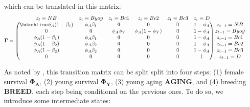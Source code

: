 \documentclass[
  12pt,
]{krantz}
\begin{document}
which can be translated in this matrix:
\[
\begin{matrix}
& \\
\mathbf{\Gamma} =
\left ( \vphantom{ \begin{matrix} 12 \\ 12 \\ 12 \\ 12 \\ 12 \\ 12 \end{matrix} } \right .
\end{matrix}
\hspace{-1.2em}
\begin{matrix}
z_t=NB & z_t = Byoy & z_t = Bc1 & z_t = Bc2 & z_t = Bc3 & z_t = D \\ \hdashline
\phi_A (1 - \beta_1) & \phi_A \beta_1 & 0 & 0 & 0 & 1 - \phi_A \\
0 & 0 & \phi_A \phi_Y & \phi_A (1-\phi_Y) & 0 & 1-\phi_A \\
\phi_A (1 - \beta_1) & \phi_A \beta_1 & 0 & 0 & 0 & 1-\phi_A \\
\phi_A (1 - \beta_2) & \phi_A \beta_2 & 0 & 0 & 0 & 1-\phi_A \\
\phi_A (1 - \beta_2) & \phi_A \beta_2 & 0 & 0 & 0 & 1-\phi_A \\
0 & 0 & 0 & 0 & 0 & 1
\end{matrix}
\hspace{-0.2em}
\begin{matrix}
& \\
\left . \vphantom{ \begin{matrix} 12 \\ 12 \\ 12 \\ 12 \\ 12 \\ 12 \end{matrix} } \right )
\begin{matrix}
z_{t-1} = NB \\
z_{t-1} = Byoy \\
z_{t-1} = Bc1 \\
z_{t-1} = Bc2 \\
z_{t-1} = Bc3 \\
z_{t-1} = D
\end{matrix}
\end{matrix}
\]

As noted by \citet{couet2019}, this transition matrix can be split split into four steps: (1) female survival \(\mathbf{\Phi_A}\), (2) young survival \(\mathbf{\Phi_Y}\), (3) young aging \(\mathbf{AGING}\), and (4) breeding \(\mathbf{BREED}\), each step being conditional on the previous ones. To do so, we introduce some intermediate states:
\end{document}
